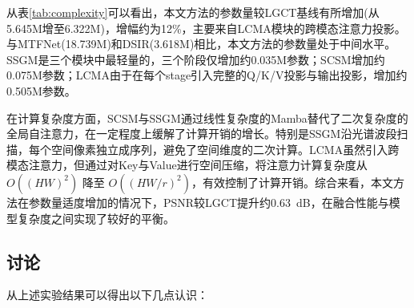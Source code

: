 \documentclass[UTF8,a4paper,11pt]{ctexart}
\begin{document}
从表\ref{tab:complexity}可以看出，本文方法的参数量较LGCT基线有所增加(从5.645M增至6.322M)，增幅约为12\%，主要来自LCMA模块的跨模态注意力投影。与MTFNet(18.739M)和DSIR(3.618M)相比，本文方法的参数量处于中间水平。SSGM是三个模块中最轻量的，三个阶段仅增加约0.035M参数；SCSM增加约0.075M参数；LCMA由于在每个stage引入完整的Q/K/V投影与输出投影，增加约0.505M参数。

在计算复杂度方面，SCSM与SSGM通过线性复杂度的Mamba替代了二次复杂度的全局自注意力，在一定程度上缓解了计算开销的增长。特别是SSGM沿光谱波段扫描，每个空间像素独立成序列，避免了空间维度的二次计算。LCMA虽然引入跨模态注意力，但通过对Key与Value进行空间压缩，将注意力计算复杂度从 $O((HW)^2)$ 降至 $O((HW/r)^2)$，有效控制了计算开销。综合来看，本文方法在参数量适度增加的情况下，PSNR较LGCT提升约0.63~dB，在融合性能与模型复杂度之间实现了较好的平衡。

\subsection{讨论}
从上述实验结果可以得出以下几点认识：
\end{document}
